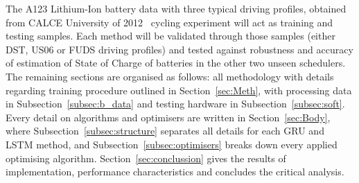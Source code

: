 The A123 Lithium-Ion battery data with three typical driving profiles, obtained from CALCE University of 2012~\cite{noauthor_calce_2017} cycling experiment will act as training and testing samples.
Each method will be validated through those samples (either DST, US06 or FUDS driving profiles) and tested against robustness and accuracy of estimation of State of Charge of batteries in the other two unseen schedulers.
%
The remaining sections are organised as follows: all methodology with details regarding training procedure outlined in Section~\ref{sec:Meth}, with processing data in Subsection~\ref{subsec:b_data} and testing hardware in Subsection~\ref{subsec:soft}.
Every detail on algorithms and optimisers are written in Section~\ref{sec:Body}, where Subsection~\ref{subsec:structure} separates all details for each GRU and LSTM method, and Subsection~\ref{subsec:optimisers} breaks down every applied optimising algorithm.
Section~\ref{sec:conclussion} gives the results of implementation, performance characteristics and concludes the critical analysis.
